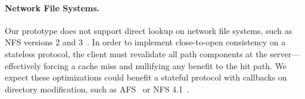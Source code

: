 \paragraph{Network File Systems.} Our prototype does not support 
direct lookup on network file systems, such as NFS versions 2 and 3~\citep{sandberg85nfs}.
In order to implement close-to-open consistency on a stateless protocol, 
the client must revalidate all path components at the server---effectively forcing 
a cache miss and nullifying any benefit to the hit path.
We expect these optimizations could benefit
a stateful protocol with callbacks on directory modification, such as AFS~\citep{howard88} or NFS 4.1~\citep{rfc5661}.








